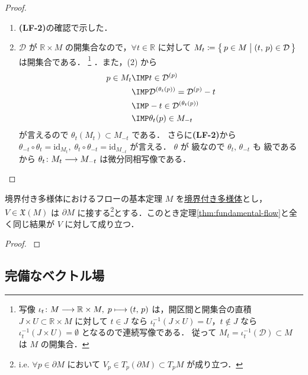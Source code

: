 \documentclass[TQFT_main]{subfiles}
\begin{document}
\begin{proof}
\begin{enumerate}
        \item \textbf{\textsf{(LF-2)}}の確認で示した．
        \item $\mathcal{D}$ が $\mathbb{R} \times M$ の開集合なので，$\forall t \in \mathbb{R}$ に対して $M_t \coloneqq \bigl\{\, p \in M \bigm| (t,\, p) \in \mathcal{D} \,\bigr\}$ は開集合である．
        \footnote{
            写像 $\iota_t \colon M \longrightarrow \mathbb{R} \times M,\; p \longmapsto (t,\, p)$ は，開区間と開集合の直積 $J \times U \subset \mathbb{R} \times M$ に対して $t \in J$ なら $\iota_t^{-1}(J \times U) = U$，$t \notin J$ なら $\iota_t^{-1}(J \times U) = \emptyset$ となるので連続写像である． 
            従って $M_t = \iota_t^{-1}(\mathcal{D}) \subset M$ は $M$ の開集合．
        }
        ．また，(2) から
        \begin{align}
            p \in M_t &\IMP t \in \mathcal{D}^{(p)} \\
            &\IMP \mathcal{D}^{(\theta_t(p))} = \mathcal{D}^{(p)} - t \\
            &\IMP -t \in \mathcal{D}^{(\theta_t(p))} \\
            &\IMP \theta_t (p) \in M_{-t}
        \end{align}
        が言えるので $\theta_t (M_t) \subset M_{-t}$ である．
        さらに\textbf{\textsf{(LF-2)}}から $\theta_{-t} \circ \theta_t = \mathrm{id}_{M_t},\; \theta_t \circ \theta_{-t} = \mathrm{id}_{M_{-t}}$ が言える．
        $\theta$ が \cinfty 級なので $\theta_t,\, \theta_{-t}$ も \cinfty 級であるから $\theta_t \colon M_t \longrightarrow M_{-t}$ は微分同相写像である．
    \end{enumerate}
    
\end{proof}

\begin{mytheo}[label=thm:fundamental-flow-boundary]{境界付き多様体におけるフローの基本定理}
    $M$ を\underline{境界付き多様体}とし，$V \in \mathfrak{X}(M)$ は $\partial M$ に接する\footnote{i.e. $\forall p \in \partial M$ において $V_p \in T_p (\partial M) \subset T_p M$ が成り立つ．}とする．このとき定理\ref{thm:fundamental-flow}と全く同じ結果が $V$ に対して成り立つ．
\end{mytheo}

\begin{proof}
    \cite[p.227, Theorem 9.34]{Lee2012smooth}
\end{proof}


\subsection{完備なベクトル場}
\end{document}
